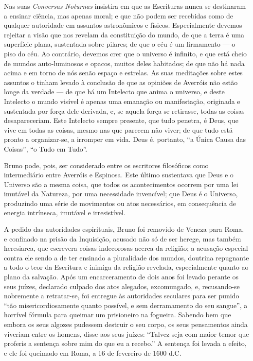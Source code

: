 \documentclass[11pt,a5paper,twoside,openany]{book}
\begin{document}
Nas suas \textit{Conversas Noturnas} insistira em que as Escrituras nunca se destinaram a ensinar ciência, mas apenas moral; e que não podem ser recebidas como de qualquer autoridade em assuntos astronômicos e físicos. Especialmente devemos rejeitar a visão que nos revelam da constituição do mundo, de que a terra é uma superfície plana, sustentada sobre pilares; de que o céu é um firmamento — o piso do céu. Ao contrário, devemos crer que o universo é infinito, e que está cheio de mundos auto-luminosos e opacos, muitos deles habitados; de que não há nada acima e em torno de nós senão espaço e estrelas. As suas meditações sobre estes assuntos o tinham levado à conclusão de que as opiniões de Averróis não estão longe da verdade — de que há um Intelecto que anima o universo, e deste Intelecto o mundo visível é apenas uma emanação ou manifestação, originada e sustentada por força dele derivada, e, se aquela força se retirasse, todas as coisas desapareceriam. Este Intelecto sempre presente, que tudo penetra, é Deus, que vive em todas as coisas, mesmo nas que parecem não viver; de que tudo está pronto a organizar-se, a irromper em vida. Deus é, portanto, “a Única Causa das Coisas”, “o Tudo em Tudo”.

Bruno pode, pois, ser considerado entre os escritores filosóficos como intermediário entre Averróis e Espinosa. Este último sustentava que Deus e o Universo são a mesma coisa, que todos os acontecimentos ocorrem por uma lei imutável da Natureza, por uma necessidade invencível; que Deus é o Universo, produzindo uma série de movimentos ou atos necessários, em consequência de energia intrínseca, imutável e irresistível.

A pedido das autoridades espirituais, Bruno foi removido de Veneza para Roma, e confinado na prisão da Inquisição, acusado não só de ser herege, mas também heresiarca, que escrevera coisas indecorosas acerca da religião; a acusação especial contra ele sendo a de ter ensinado a pluralidade dos mundos, doutrina repugnante a todo o teor da Escritura e inimiga da religião revelada, especialmente quanto ao plano da salvação. Após um encarceramento de dois anos foi levado perante os seus juízes, declarado culpado dos atos alegados, excomungado, e, recusando-se nobremente a retratar-se, foi entregue às autoridades seculares para ser punido “tão misericordiosamente quanto possível, e sem derramamento do seu sangue”, a horrível fórmula para queimar um prisioneiro na fogueira. Sabendo bem que embora os seus algozes pudessem destruir o seu corpo, os seus pensamentos ainda viveriam entre os homens, disse aos seus juízes: “Talvez seja com maior temor que proferis a sentença sobre mim do que eu a recebo.” A sentença foi levada a efeito, e ele foi queimado em Roma, a 16 de fevereiro de 1600 d.C.
\end{document}
